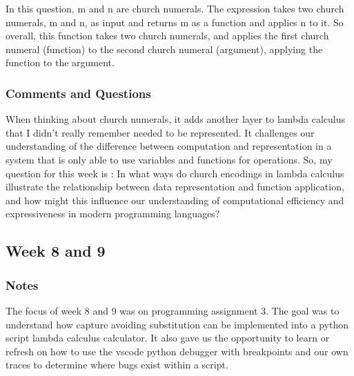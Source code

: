 \documentclass{article}
\theoremstyle{theorem}
\theoremstyle{definition}
\theoremstyle{remark}
\begin{document}
In this question, m and n are church numerals. The expression takes two church 
numerals, m and n, as input and returns m as a function and applies n to it. So overall, this function takes two church
numerals, and applies the first church numeral (function) to the second church numeral
(argument), applying the function to the argument.
\subsubsection*{Comments and Questions}
When thinking about church numerals, it adds another layer to lambda calculus that
I didn't really remember needed to be represented. It challenges our understanding of 
the difference between computation and representation in a system that is only able to 
use variables and functions for operations. So, my question for this week is :
In what ways do church encodings in lambda calculus illustrate the relationship between 
data representation and function application, and how might this influence our understanding
of computational efficiency and expressiveness in modern programming languages?
\subsection{Week 8 and 9}
\subsubsection*{Notes}
The focus of week 8 and 9 was on programming assignment 3. The goal was to understand 
how capture avoiding substitution can be implemented into a python script lambda calculus calculator.
It also gave us the opportunity to learn or refresh on how to use the vscode python debugger with 
breakpoints and our own traces to determine where bugs exist within a script.
\end{document}
